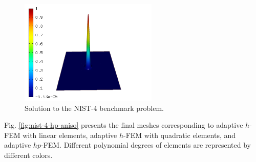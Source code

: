 \documentclass[12pt]{elsarticle}
\begin{document}
\begin{figure}[H]
\centering
\includegraphics[height=5cm]{nist/nist-4/solution.png}
\caption{Solution to the NIST-4 benchmark problem.}
\vspace{-3mm}
\label{fig:sln-nist04}
\end{figure}


Fig. \ref{fig:nist-4-hp-aniso} presents the final meshes corresponding to adaptive $h$-FEM with 
linear elements, adaptive $h$-FEM with quadratic elements, and adaptive $hp$-FEM. Different 
polynomial degrees of elements are represented by different colors. 
\end{document}
